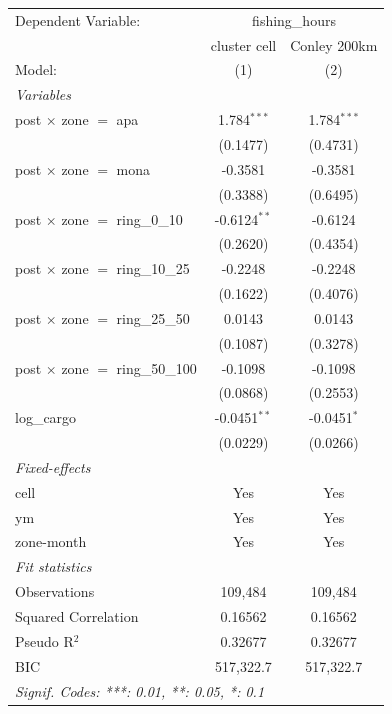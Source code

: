 
\begingroup
\centering
\begin{tabular}{lcc}
   \tabularnewline \midrule \midrule
   Dependent Variable: & \multicolumn{2}{c}{fishing\_hours}\\
                                           & cluster cell   & Conley 200km \\   
   Model:                                  & (1)            & (2)\\  
   \midrule
   \emph{Variables}\\
   post $\times$ zone $=$ apa              & 1.784$^{***}$  & 1.784$^{***}$\\   
                                           & (0.1477)       & (0.4731)\\   
   post $\times$ zone $=$ mona             & -0.3581        & -0.3581\\   
                                           & (0.3388)       & (0.6495)\\   
   post $\times$ zone $=$ ring\_0\_10      & -0.6124$^{**}$ & -0.6124\\   
                                           & (0.2620)       & (0.4354)\\   
   post $\times$ zone $=$ ring\_10\_25     & -0.2248        & -0.2248\\   
                                           & (0.1622)       & (0.4076)\\   
   post $\times$ zone $=$ ring\_25\_50     & 0.0143         & 0.0143\\   
                                           & (0.1087)       & (0.3278)\\   
   post $\times$ zone $=$ ring\_50\_100    & -0.1098        & -0.1098\\   
                                           & (0.0868)       & (0.2553)\\   
   log\_cargo                              & -0.0451$^{**}$ & -0.0451$^{*}$\\   
                                           & (0.0229)       & (0.0266)\\   
   \midrule
   \emph{Fixed-effects}\\
   cell                                    & Yes            & Yes\\  
   ym                                      & Yes            & Yes\\  
   zone-month                              & Yes            & Yes\\  
   \midrule
   \emph{Fit statistics}\\
   Observations                            & 109,484        & 109,484\\  
   Squared Correlation                     & 0.16562        & 0.16562\\  
   Pseudo R$^2$                            & 0.32677        & 0.32677\\  
   BIC                                     & 517,322.7      & 517,322.7\\  
   \midrule \midrule
   \multicolumn{3}{l}{\emph{Signif. Codes: ***: 0.01, **: 0.05, *: 0.1}}\\
\end{tabular}
\par\endgroup



